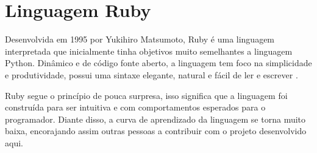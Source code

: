 


\section{Linguagem Ruby}
Desenvolvida em 1995 por Yukihiro Matsumoto, Ruby é uma linguagem interpretada que inicialmente tinha objetivos muito semelhantes a linguagem Python\cite{purer2009phpvspythonvsruby}. Dinâmico e de código fonte aberto, a linguagem tem foco na simplicidade e produtividade, possui uma sintaxe elegante, natural e fácil de ler e escrever \cite{siteruby}. \par
Ruby segue o princípio de pouca surpresa, isso significa que a linguagem foi construída para ser intuitiva e com comportamentos esperados para o programador\cite{purer2009phpvspythonvsruby}. Diante disso, a curva de aprendizado da linguagem se torna muito baixa, encorajando assim outras pessoas a contribuir com o projeto desenvolvido aqui.





